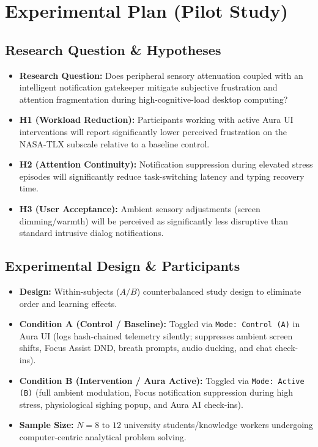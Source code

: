 \documentclass[11pt,a4paper]{article}
\begin{document}
\newpage

\section{Experimental Plan (Pilot Study)}

\subsection{Research Question \& Hypotheses}
\begin{itemize}[leftmargin=1.5em, itemsep=3pt]
    \item \textbf{Research Question:} Does peripheral sensory attenuation coupled with an intelligent notification gatekeeper mitigate subjective frustration and attention fragmentation during high-cognitive-load desktop computing?
    \item \textbf{H1 (Workload Reduction):} Participants working with active Aura UI interventions will report significantly lower perceived frustration on the NASA-TLX subscale relative to a baseline control.
    \item \textbf{H2 (Attention Continuity):} Notification suppression during elevated stress episodes will significantly reduce task-switching latency and typing recovery time.
    \item \textbf{H3 (User Acceptance):} Ambient sensory adjustments (screen dimming/warmth) will be perceived as significantly less disruptive than standard intrusive dialog notifications.
\end{itemize}

\subsection{Experimental Design \& Participants}
\begin{itemize}[leftmargin=1.5em, itemsep=2pt]
    \item \textbf{Design:} Within-subjects ($A/B$) counterbalanced study design to eliminate order and learning effects.
    \item \textbf{Condition A (Control / Baseline):} Toggled via \texttt{Mode: Control (A)} in Aura UI (logs hash-chained telemetry silently; suppresses ambient screen shifts, Focus Assist DND, breath prompts, audio ducking, and chat check-ins).
    \item \textbf{Condition B (Intervention / Aura Active):} Toggled via \texttt{Mode: Active (B)} (full ambient modulation, Focus notification suppression during high stress, physiological sighing popup, and Aura AI check-ins).
    \item \textbf{Sample Size:} $N = 8 \text{ to } 12$ university students/knowledge workers undergoing computer-centric analytical problem solving.
\end{itemize}
\end{document}
